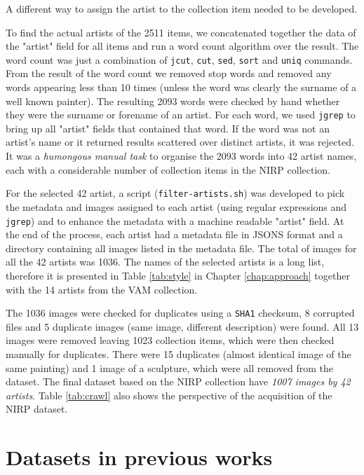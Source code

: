 \documentclass[11pt,a4paper,twoside,openright]{report}
\begin{document}
A different way to assign the artist to the collection item needed to be
developed.

To find the actual artists of the 2511 items, we concatenated together the data
of the "artist" field for all items and run a word count algorithm over the
result.  The word count was just a combination of \texttt{jcut}, \texttt{cut},
\texttt{sed}, \texttt{sort} and \texttt{uniq} commands.  From the result of the
word count we removed stop words and removed any words appearing less than 10
times (unless the word was clearly the surname of a well known painter).  The
resulting 2093 words were checked by hand whether they were the surname or
forename of an artist.  For each word, we used \texttt{jgrep} to bring up all
"artist" fields that contained that word.  If the word was not an artist's name
or it returned results scattered over distinct artists, it was rejected.  It
was a \emph{humongous manual task} to organise the 2093 words into 42 artist
names, each with a considerable number of collection items in the NIRP
collection.

For the selected 42 artist, a script (\texttt{filter-artists.sh}) was developed
to pick the metadata and images assigned to each artist (using regular
expressions and \texttt{jgrep}) and to enhance the metadata with a machine
readable "artist" field.  At the end of the process, each artist had a metadata
file in JSONS format and a directory containing all images listed in the
metadata file.  The total of images for all the 42 artists was 1036.  The names
of the selected artists is a long list, therefore it is presented in Table
\ref{tab:style} in Chapter \ref{chap:approach} together with the 14 artists
from the VAM collection.

The 1036 images were checked for duplicates using a \texttt{SHA1} checksum, 8
corrupted files and 5 duplicate images (same image, different description) were
found.  All 13 images were removed leaving 1023 collection items, which were
then checked manually for duplicates.  There were 15 duplicates (almost
identical image of the same painting) and 1 image of a sculpture, which were
all removed from the dataset.  The final dataset based on the NIRP collection
have \emph{1007 images by 42 artists}.  Table \ref{tab:crawl} also shows the
perspective of the acquisition of the NIRP dataset.

\section{Datasets in previous works}
\end{document}
